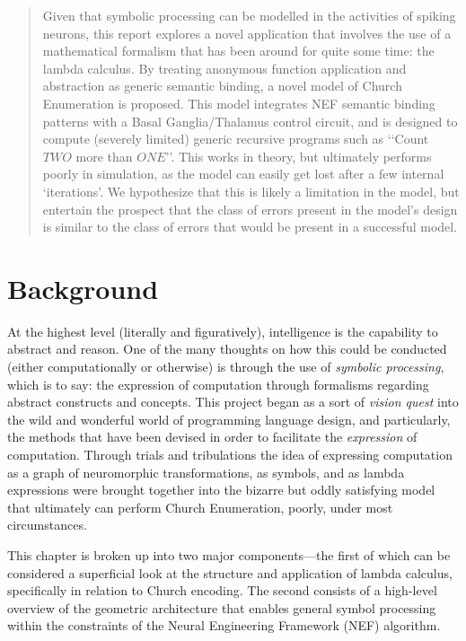 \documentclass{report}
\date{\today}
\author{Alexander Huras}
\begin{document}

\dotableofcontents
\newpage

\begin{abstract} 
Given that symbolic processing can be modelled in the activities of spiking neurons, this report explores a novel application that involves the use of a mathematical formalism that has been around for quite some time: the lambda calculus.
By treating anonymous function application and abstraction as generic semantic binding, a novel model of Church Enumeration is proposed.
This model integrates NEF semantic binding patterns with a Basal Ganglia/Thalamus control circuit, and is designed to compute (severely limited) generic recursive programs such as \lq\lq{}Count $TWO$ more than $ONE$\rq\rq{}.
This works in theory, but ultimately performs poorly in simulation, as the model can easily get lost after a few internal \lq{}iterations\rq{}.
We hypothesize that this is likely a limitation in the model, but entertain the prospect that the class of errors present in the model\rq{}s design is similar to the class of errors that would be present in a successful model.

\end{abstract}


\chapter{Background}

At the highest level (literally and figuratively), intelligence is the capability to abstract and reason.
One of the many thoughts on how this could be conducted (either computationally or otherwise) is through the use of \emph{symbolic processing}, which is to say: the expression of computation through formalisms regarding abstract constructs and concepts.
This project began as a sort of \emph{vision quest} into the wild and wonderful world of programming language design, and particularly, the methods that have been devised in order to facilitate the \emph{expression} of computation.
Through trials and tribulations the idea of expressing computation as a graph of neuromorphic transformations, as symbols, and as lambda expressions were brought together into the bizarre but oddly satisfying model that ultimately can perform Church Enumeration, poorly, under most circumstances.

This chapter is broken up into two major components---the first of which can be considered a superficial look at the structure and application of lambda calculus, specifically in relation to Church encoding.
The second consists of a high-level overview of the geometric architecture that enables general symbol processing within the constraints of the Neural Engineering Framework (NEF) algorithm.
\end{document}
